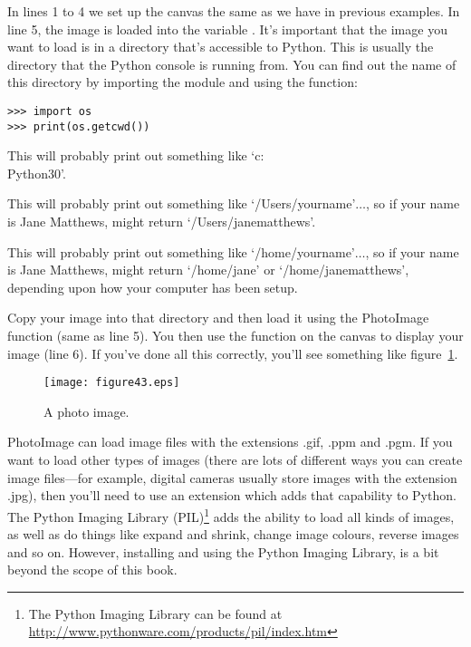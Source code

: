 In lines 1 to 4 we set up the canvas the same as we have in previous examples. In line 5, the image is loaded into the variable . It's important that the image you want to load is in a directory that's accessible to Python. This is usually the directory that the Python console is running from. You can find out the name of this directory by importing the  module and using the  function:

\begin{listing}
\begin{verbatim}
>>> import os
>>> print(os.getcwd())
\end{verbatim}
\end{listing}

\begin{WINDOWS}
This will probably print out something like `c:\\Python30'.
\end{WINDOWS}

\begin{MAC}
This will probably print out something like `/Users/yourname'$\ldots$, so if your name is Jane Matthews,  might return `/Users/janematthews'.
\end{MAC}

\begin{LINUX}
This will probably print out something like `/home/yourname'$\ldots$, so if your name is Jane Matthews,  might return `/home/jane' or `/home/janematthews', depending upon how your computer has been setup.
\end{LINUX}

Copy your image into that directory and then load it using the PhotoImage function (same as line 5). You then use the  function on the canvas to display your image (line 6). If you've done all this correctly, you'll see something like figure~\ref{fig43}.

\begin{figure}
\begin{center}
\texttt{[image: figure43.eps]}
\end{center}
\caption{A photo image.}\label{fig43}
\end{figure}

PhotoImage can load image files with the extensions .gif, .ppm and .pgm. If you want to load other types of images (there are lots of different ways you can create image files---for example, digital cameras usually store images with the extension .jpg), then you'll need to use an extension which adds that capability to Python. The Python Imaging Library (PIL)\footnote{The Python Imaging Library can be found at \href{http://www.pythonware.com/products/pil/index.htm}{http://www.pythonware.com/products/pil/index.htm}} adds the ability to load all kinds of images, as well as do things like expand and shrink, change image colours, reverse images and so on. However, installing and using the Python Imaging Library, is a bit beyond the scope of this book.

